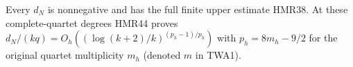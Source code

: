Every $d_N$ is nonnegative and has the full finite
upper estimate HMR38. At these complete-quartet degrees
HMR44 proves
$d_N/(kq)=O_h((\log(k+2)/k)^{(p_h-1)/p_h})$ with
$p_h=8m_h-9/2$ for the original quartet multiplicity $m_h$
(denoted $m$ in TWA1).